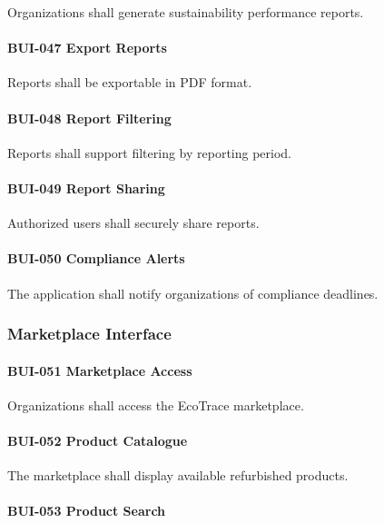 Organizations shall generate sustainability performance reports.

\paragraph{BUI-047 Export Reports}

Reports shall be exportable in PDF format.

\paragraph{BUI-048 Report Filtering}

Reports shall support filtering by reporting period.

\paragraph{BUI-049 Report Sharing}

Authorized users shall securely share reports.

\paragraph{BUI-050 Compliance Alerts}

The application shall notify organizations of compliance deadlines.


\subsubsection*{Marketplace Interface}

\paragraph{BUI-051 Marketplace Access}

Organizations shall access the EcoTrace marketplace.

\paragraph{BUI-052 Product Catalogue}

The marketplace shall display available refurbished products.

\paragraph{BUI-053 Product Search}

